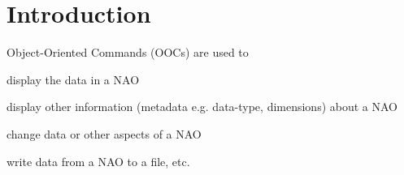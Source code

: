 
\section{Introduction}
    \label{ooc-Introduction}

Object-Oriented Commands (OOCs) are used to
\begin{bullets}
    \item display the data in a NAO
    \item display other information (metadata e.g. data-type, dimensions)
    about a NAO
    \item change data or other aspects of a NAO
    \item write data from a NAO to a file, etc.
\end{bullets}
